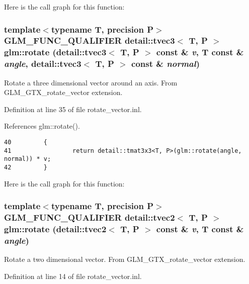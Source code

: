 Here is the call graph for this function:\hypertarget{group__gtx__rotate__vector_gf0809ae83e84fc9880b4c8b7093c349c}{
\subsubsection[rotate]{\setlength{\rightskip}{0pt plus 5cm}template$<$typename T, precision P$>$ GLM\_\-FUNC\_\-QUALIFIER detail::tvec3$<$ T, P $>$ glm::rotate (detail::tvec3$<$ T, P $>$ const \& {\em v}, \/  T const \& {\em angle}, \/  detail::tvec3$<$ T, P $>$ const \& {\em normal})}}
\label{group__gtx__rotate__vector_gf0809ae83e84fc9880b4c8b7093c349c}


Rotate a three dimensional vector around an axis. From GLM\_\-GTX\_\-rotate\_\-vector extension. 

Definition at line 35 of file rotate\_\-vector.inl.

References glm::rotate().

\begin{Code}\begin{verbatim}40         {
41                 return detail::tmat3x3<T, P>(glm::rotate(angle, normal)) * v;
42         }
\end{verbatim}
\end{Code}




Here is the call graph for this function:\hypertarget{group__gtx__rotate__vector_gc1ec422e7ac679e3332b381e88d29dfd}{
\subsubsection[rotate]{\setlength{\rightskip}{0pt plus 5cm}template$<$typename T, precision P$>$ GLM\_\-FUNC\_\-QUALIFIER detail::tvec2$<$ T, P $>$ glm::rotate (detail::tvec2$<$ T, P $>$ const \& {\em v}, \/  T const \& {\em angle})}}
\label{group__gtx__rotate__vector_gc1ec422e7ac679e3332b381e88d29dfd}


Rotate a two dimensional vector. From GLM\_\-GTX\_\-rotate\_\-vector extension. 

Definition at line 14 of file rotate\_\-vector.inl.

